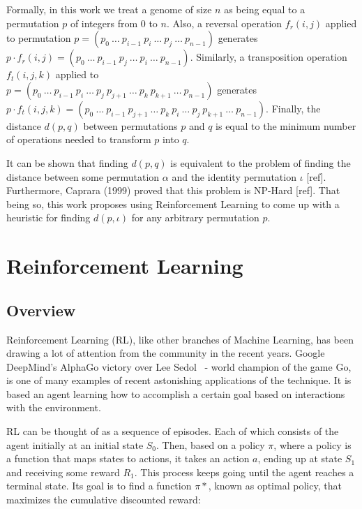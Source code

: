 \documentclass[11pt,twoside]{article}
\begin{document}
Formally, in this work we treat a genome of size $n$ as being equal to a permutation $p$ of integers from $0$ to $n$. Also, a reversal operation $f_r(i,j)$ applied to permutation $p = (p_0\ \ldots\ p_{i-1}\ p_{i}\ \ldots\ p_{j}\ \ldots\ p_{n-1})$ generates $p \cdot f_r(i,j) = (p_0\ \ldots\ p_{i-1}\ p_{j}\ \ldots\ p_{i}\ \ldots\ p_{n-1})$. Similarly, a transposition operation $f_t(i,j,k)$ applied to\\ $p = (p_0\ \ldots\ p_{i-1}\ p_{i}\ \ldots\ p_{j}\ p_{j+1}\ \ldots\ p_{k}\ p_{k+1}\ \ldots\ p_{n-1})$ generates\\ $p \cdot f_t(i,j,k) = (p_0\ \ldots\ p_{i-1}\ p_{j+1}\ \ldots\ p_{k}\ p_{i}\ \ldots\ p_{j}\ p_{k+1}\ \ldots\ p_{n-1})$. Finally, the distance $d(p, q)$ between permutations $p$ and $q$ is equal to the minimum number of operations needed to transform $p$ into $q$.

It can be shown that finding $d(p, q)$ is equivalent to the problem of finding the distance between some permutation $\alpha$ and the identity permutation $\iota$ [ref]. Furthermore, Caprara (1999) proved that this problem is NP-Hard [ref]. That being so, this work proposes using Reinforcement Learning to come up with a heuristic for finding $d(p, \iota)$ for any arbitrary permutation $p$.

\section{Reinforcement Learning}


\subsection{Overview}

Reinforcement Learning (RL), like other branches of Machine Learning, has been drawing a lot of attention from the community in the recent years. Google DeepMind's AlphaGo victory over Lee Sedol~\cite{googlelee} - world champion of the game Go, is one of many examples of recent astonishing applications of the technique. It is based an agent learning how to accomplish a certain goal based on interactions with the environment.

RL can be thought of as a sequence of episodes. Each of which consists of the agent initially at an initial state $S_0$. Then, based on a policy $\pi$, where a policy is a function that maps states to actions, it takes an action $a$, ending up at state $S_1$ and receiving some reward $R_1$. This process keeps going until the agent reaches a terminal state. Its goal is to find a function $\pi*$, known as optimal policy, that maximizes the cumulative discounted reward:
\end{document}
